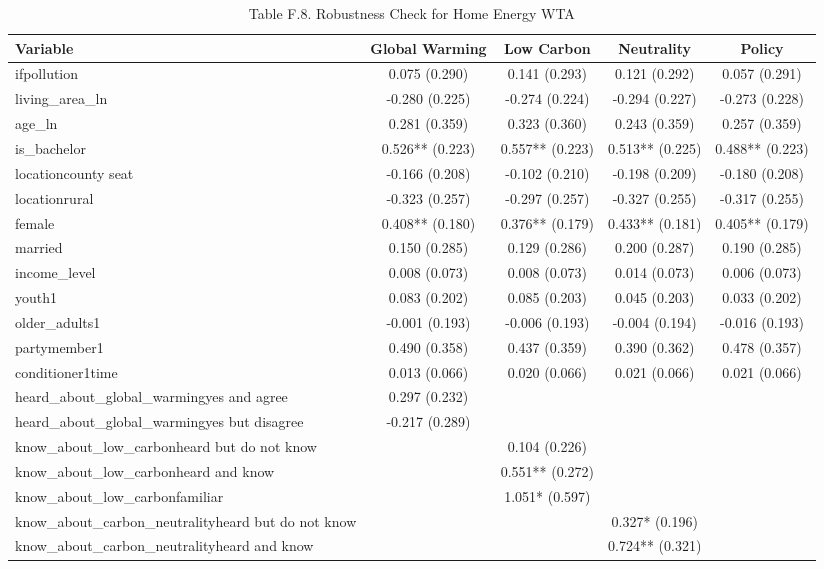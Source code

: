\begin{table}[!htbp]
\centering
\caption{Table F.8. Robustness Check for Home Energy WTA}
\begin{tabular}{lcccc}
\hline
Variable & Global Warming & Low Carbon & Neutrality & Policy \\
\hline
ifpollution & 0.075 (0.290) & 0.141 (0.293) & 0.121 (0.292) & 0.057 (0.291) \\
living\_area\_ln & -0.280 (0.225) & -0.274 (0.224) & -0.294 (0.227) & -0.273 (0.228) \\
age\_ln & 0.281 (0.359) & 0.323 (0.360) & 0.243 (0.359) & 0.257 (0.359) \\
is\_bachelor & 0.526** (0.223) & 0.557** (0.223) & 0.513** (0.225) & 0.488** (0.223) \\
locationcounty seat & -0.166 (0.208) & -0.102 (0.210) & -0.198 (0.209) & -0.180 (0.208) \\
locationrural & -0.323 (0.257) & -0.297 (0.257) & -0.327 (0.255) & -0.317 (0.255) \\
female & 0.408** (0.180) & 0.376** (0.179) & 0.433** (0.181) & 0.405** (0.179) \\
married & 0.150 (0.285) & 0.129 (0.286) & 0.200 (0.287) & 0.190 (0.285) \\
income\_level & 0.008 (0.073) & 0.008 (0.073) & 0.014 (0.073) & 0.006 (0.073) \\
youth1 & 0.083 (0.202) & 0.085 (0.203) & 0.045 (0.203) & 0.033 (0.202) \\
older\_adults1 & -0.001 (0.193) & -0.006 (0.193) & -0.004 (0.194) & -0.016 (0.193) \\
partymember1 & 0.490 (0.358) & 0.437 (0.359) & 0.390 (0.362) & 0.478 (0.357) \\
conditioner1time & 0.013 (0.066) & 0.020 (0.066) & 0.021 (0.066) & 0.021 (0.066) \\
heard\_about\_global\_warmingyes and agree & 0.297 (0.232) &  &  &  \\
heard\_about\_global\_warmingyes but disagree & -0.217 (0.289) &  &  &  \\
know\_about\_low\_carbonheard but do not know &  & 0.104 (0.226) &  &  \\
know\_about\_low\_carbonheard and know &  & 0.551** (0.272) &  &  \\
know\_about\_low\_carbonfamiliar &  & 1.051* (0.597) &  &  \\
know\_about\_carbon\_neutralityheard but do not know &  &  & 0.327* (0.196) &  \\
know\_about\_carbon\_neutralityheard and know &  &  & 0.724** (0.321) &  \\

\end{tabular}
\end{table}
